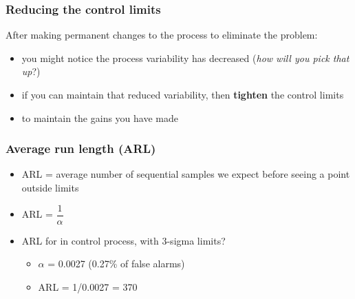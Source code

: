 \begin{frame}\frametitle{Reducing the control limits}
	After making permanent changes to the process to eliminate the problem:
	\begin{itemize}
		\item	you might notice the process variability has decreased (\emph{how will you pick that up}?)
		\item	if you can maintain that reduced variability, then \textbf{tighten} the control limits
		\item	to maintain the gains you have made
	\end{itemize}
\end{frame}

\begin{frame}\frametitle{Average run length (ARL)}
	\begin{itemize}
		\item	ARL = average number of sequential samples we expect before seeing a point outside limits
		\item	ARL = $\dfrac{1}{\alpha}$
		\item	ARL for in control process, with 3-sigma limits?
		\begin{itemize}
			\item	$\alpha$ = 0.0027 (0.27\% of false alarms)
			\item	ARL = 1/0.0027 = 370
		\end{itemize}
	\end{itemize}
\end{frame}

